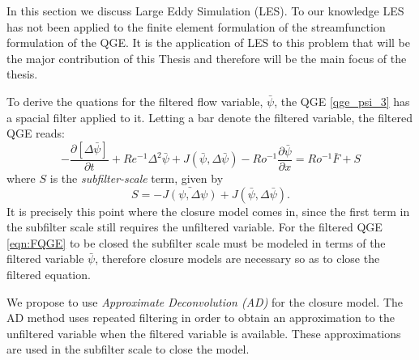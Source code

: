 In this section we discuss Large Eddy Simulation (LES). To our knowledge LES has not been applied to
the finite element formulation of the streamfunction formulation of the QGE. It is the application
of LES to this problem that will be the major contribution of this Thesis and therefore will be the
main focus of the thesis. 

To derive the quations for the filtered flow variable, $\bar{\psi}$, the QGE \eqref{qge_psi_3} has a
spacial filter applied to it. Letting a bar denote the filtered variable, the filtered QGE reads:
\begin{equation}
  -\frac{\partial [\Delta \bar{\psi}]}{\partial t} + Re^{-1} \Delta^2 \bar{\psi} +
    J(\bar{\psi},\Delta \bar{\psi}) - Ro^{-1} \frac{\partial \bar{\psi}}{\partial x} = Ro^{-1}
    \bar{F} + S
  \label{eqn:FQGE}
\end{equation}
where $S$ is the \emph{subfilter-scale} term, given by
\begin{equation}
  S = - \bar{J(\psi, \Delta \psi)} + J(\bar{\psi}, \Delta \bar{\psi}). 
  \label{eqn:Subfilter}
\end{equation}
It is precisely this point where the closure model comes in, since the first term in the subfilter
scale still requires the unfiltered variable. For the filtered QGE \eqref{eqn:FQGE} to be closed the
subfilter scale must be modeled in terms of the filtered variable $\bar{\psi}$, therefore closure
models are necessary so as to close the filtered equation. 

We propose to use \emph{Approximate Deconvolution (AD)} for the closure model. The AD method uses
repeated filtering in order to obtain an approximation to the unfiltered variable when the filtered
variable is available. These approximations are used in the subfilter scale to close the model. 

